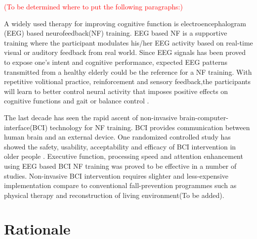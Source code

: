 \documentclass{article}
\begin{document}
\textcolor{red}{(To be determined where to put the following paragraphs:)}

A widely used therapy for improving cognitive function is electroencephalogram (EEG) based neurofeedback(NF) training. EEG based NF is a supportive training where the participant modulates his/her EEG activity based on real-time visual or auditory feedback from real world. Since EEG signals has been proved to expose one's intent and cognitive performance, expected EEG patterns transmitted from a healthy elderly could be the reference for a NF training. With repetitive volitional practice, reinforcement and sensory feedback,the participants will learn to better control neural activity that imposes positive effects on cognitive functions and gait or balance control \cite{Miladinovic_2020}. 



The last decade has seen the rapid ascent of non-invasive brain-computer-interface(BCI) technology for NF training. BCI provides communication between human brain and an external device. One randomized controlled study has showed the safety, usability, acceptability and efficacy of BCI intervention in older people \cite{Lee_2013}. Executive function, processing speed \cite{Nouchi_2012} and attention \cite{Arvaneh_2019} enhancement using EEG based BCI NF training was proved to be effective in a number of studies. Non-invasive BCI intervention requires slighter and less-expensive implementation compare to conventional fall-prevention programmes such as physical therapy and reconstruction of living environment(To be added). 

\section{Rationale}
\begin{comment}
Aim: To explain why the research questions/aim(s) being addressed are important and why closely related questions are not being covered. 
This should include:
•	A clear explanation of the research question/aim(s) and the justification of the study i.e. why the question is worth asking and, through consultation with public and patient groups, why this is worthwhile to participants or wider service delivery.
•	A contextual framing of the research question/aim(s) in relation to relevant policy and historical and/or literature bases.
\end{comment}
\end{document}
